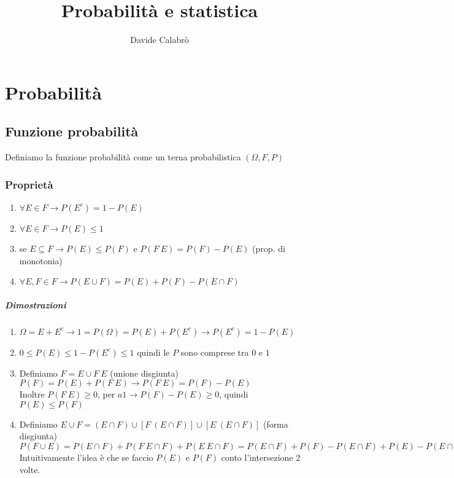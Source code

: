 \documentclass{article}
\title{Probabilità e statistica}
\author{Davide Calabrò}
\begin{document}
	\maketitle
	\newpage
	
	\newpage
	\section*{Probabilità}
	\subsection*{Funzione probabilità}
	Definiamo la funzione probabilità come un terna probabilistica $(\Omega, F, P)$
	\subsubsection*{Proprietà}
	\begin{enumerate}
		\item $\forall E \in F \rightarrow P(E^c) = 1 - P(E)$
		\item $\forall E \in F \rightarrow P(E) \leq 1$
		\item se $E \subseteq F \rightarrow P(E) \leq P(F)$ e $P(F \ E) = P(F) - P(E)$ (prop. di monotonia)
		\item $\forall E, F \in F \rightarrow P(E \cup F) = P(E) + P(F) - P(E \cap F)$
	\end{enumerate}
	\subparagraph*{Dimostrazioni}
	\begin{enumerate}
		\item $\Omega = E + E^c \rightarrow 1 = P(\Omega) = P(E) + P(E^c) \rightarrow P(E^c) = 1 - P(E)$
		\item $0 \leq P(E) \leq 1 - P(E^c) \leq 1$ quindi le $P$ sono comprese tra $0$ e $1$
		\item Definiamo $F = E \cup F \ E$ (unione disgiunta)\\
			$P(F) = P(E) + P(F \ E) \rightarrow P(F \ E) = P(F) - P(E)$\\
			Inoltre $P(F \ E) \geq 0$, per $a1 \rightarrow P(F) - P(E) \geq 0$, quindi $P(E) \leq P(F)$
		\item Definiamo $E \cup F = (E \cap F) \cup [F \ (E \cap F)] \cup [E \ (E \cap F)]$ (forma disgiunta)\\
		$P(F \cup E) = P(E \cap F) + P(F \ E \cap F) + P(E \ E \cap F) = P(E \cap F) + P(F) - P(E \cap F) + P(E) - P(E \cap F) = P(F) + P(E) - P(E \cap F)$\\
		Intuitivamente l'idea è che se faccio $P(E)$ e $P(F)$ conto l'intersezione 2 volte.		 
	\end{enumerate}
	
\end{document}
